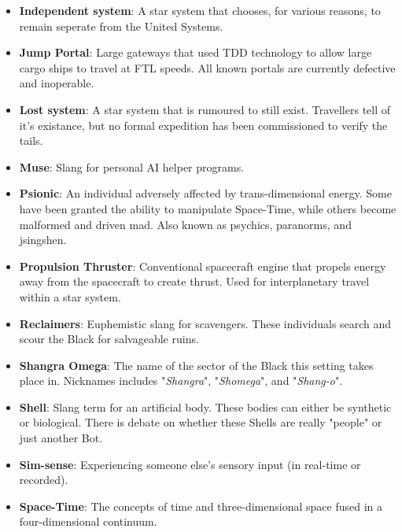 \documentclass[10pt,twoside]{article}
\begin{document}
\begin{multicols}{2}
\begin{itemize}
    \item \textbf{Independent system}: A star system that chooses, for various reasons, to remain seperate from the United Systems.

    \item \textbf{Jump Portal}: Large gateways that used TDD technology to allow large cargo ships to travel at FTL speeds. All known portals are currently defective and inoperable.
    
    \item \textbf{Lost system}: A star system that is rumoured to still exist. Travellers tell of it's existance, but no formal expedition has been commissioned to verify the tails.

    \item \textbf{Muse}: Slang for personal AI helper programs.

    \item \textbf{Psionic}: An individual adversely affected by trans-dimensional energy. Some have been granted the ability to manipulate Space-Time, while others become malformed and driven mad. Also known as psychics, paranorms, and jsingshen.

    \item \textbf{Propulsion Thruster}: Conventional spacecraft engine that propels energy away from the spacecraft to create thrust. Used for interplanetary travel within a star system.

    \item \textbf{Reclaimers}: Euphemistic slang for scavengers. These individuals search and scour the Black for salvageable ruins.
    
    \item \textbf{Shangra Omega}: The name of the sector of the Black this setting takes place in. Nicknames includes "\textit{Shangra}", "\textit{Shomega}", and "\textit{Shang-o}".

    \item \textbf{Shell}: Slang term for an artificial body. These bodies can either be synthetic or biological. There is debate on whether these Shells are really "people" or just another Bot.

    \item \textbf{Sim-sense}: Experiencing someone else's sensory input (in real-time or recorded).

    \item \textbf{Space-Time}: The concepts of time and three-dimensional space fused in a four-dimensional continuum.


\end{itemize}
\end{multicols}
\end{document}
